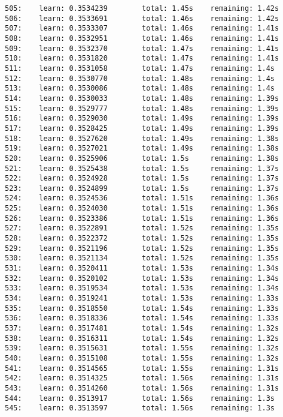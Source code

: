 \documentclass[11pt]{article}
\begin{document}
\begin{Verbatim}[commandchars=\\\{\}]
505:    learn: 0.3534239        total: 1.45s    remaining: 1.42s
506:    learn: 0.3533691        total: 1.46s    remaining: 1.42s
507:    learn: 0.3533307        total: 1.46s    remaining: 1.41s
508:    learn: 0.3532951        total: 1.46s    remaining: 1.41s
509:    learn: 0.3532370        total: 1.47s    remaining: 1.41s
510:    learn: 0.3531820        total: 1.47s    remaining: 1.41s
511:    learn: 0.3531058        total: 1.47s    remaining: 1.4s
512:    learn: 0.3530770        total: 1.48s    remaining: 1.4s
513:    learn: 0.3530086        total: 1.48s    remaining: 1.4s
514:    learn: 0.3530033        total: 1.48s    remaining: 1.39s
515:    learn: 0.3529777        total: 1.48s    remaining: 1.39s
516:    learn: 0.3529030        total: 1.49s    remaining: 1.39s
517:    learn: 0.3528425        total: 1.49s    remaining: 1.39s
518:    learn: 0.3527620        total: 1.49s    remaining: 1.38s
519:    learn: 0.3527021        total: 1.49s    remaining: 1.38s
520:    learn: 0.3525906        total: 1.5s     remaining: 1.38s
521:    learn: 0.3525438        total: 1.5s     remaining: 1.37s
522:    learn: 0.3524928        total: 1.5s     remaining: 1.37s
523:    learn: 0.3524899        total: 1.5s     remaining: 1.37s
524:    learn: 0.3524536        total: 1.51s    remaining: 1.36s
525:    learn: 0.3524030        total: 1.51s    remaining: 1.36s
526:    learn: 0.3523386        total: 1.51s    remaining: 1.36s
527:    learn: 0.3522891        total: 1.52s    remaining: 1.35s
528:    learn: 0.3522372        total: 1.52s    remaining: 1.35s
529:    learn: 0.3521196        total: 1.52s    remaining: 1.35s
530:    learn: 0.3521134        total: 1.52s    remaining: 1.35s
531:    learn: 0.3520411        total: 1.53s    remaining: 1.34s
532:    learn: 0.3520102        total: 1.53s    remaining: 1.34s
533:    learn: 0.3519534        total: 1.53s    remaining: 1.34s
534:    learn: 0.3519241        total: 1.53s    remaining: 1.33s
535:    learn: 0.3518550        total: 1.54s    remaining: 1.33s
536:    learn: 0.3518336        total: 1.54s    remaining: 1.33s
537:    learn: 0.3517481        total: 1.54s    remaining: 1.32s
538:    learn: 0.3516311        total: 1.54s    remaining: 1.32s
539:    learn: 0.3515631        total: 1.55s    remaining: 1.32s
540:    learn: 0.3515108        total: 1.55s    remaining: 1.32s
541:    learn: 0.3514565        total: 1.55s    remaining: 1.31s
542:    learn: 0.3514325        total: 1.56s    remaining: 1.31s
543:    learn: 0.3514260        total: 1.56s    remaining: 1.31s
544:    learn: 0.3513917        total: 1.56s    remaining: 1.3s
545:    learn: 0.3513597        total: 1.56s    remaining: 1.3s

\end{Verbatim}
\end{document}
